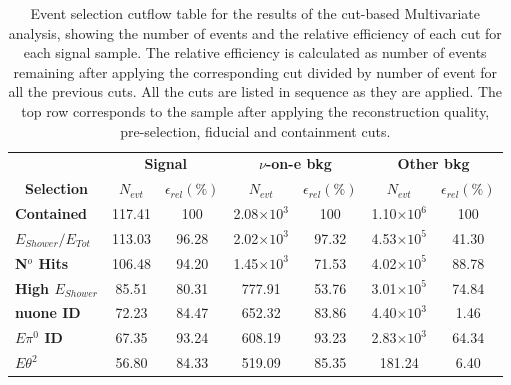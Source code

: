 \begin{table}[!hb]
\centering
\caption[Multivariate analysis cutflow table]{Event selection cutflow table for the results of the cut-based Multivariate analysis, showing the number of events and the relative efficiency of each cut for each signal sample. The relative efficiency is calculated as number of events remaining after applying the corresponding cut divided by number of event for all the previous cuts. All the cuts are listed in sequence as they are applied. The top row corresponds to the sample after applying the reconstruction quality, pre-selection, fiducial and containment cuts.}
\begin{tabular}{|l|cc|cc|cc|}\hline
\multicolumn{1}{|c|}{} & \multicolumn{2}{c|}{\textbf{Signal}} & \multicolumn{2}{c|}{\textbf{$\nu$-on-e bkg}} & \multicolumn{2}{c|}{\textbf{Other bkg}} \\
\multicolumn{1}{|c|}{\multirow{-2}{*}{\textbf{Selection}}} & \textbf{$N_{evt}$} & \textbf{$\epsilon_{rel}\left(\%\right)$} & \textbf{$N_{evt}$} & \textbf{$\epsilon_{rel}\left(\%\right)$}  & \textbf{$N_{evt}$} & \textbf{$\epsilon_{rel}\left(\%\right)$}\\\hline
\textbf{Contained} & 117.41 & 100 & 2.08$\times 10^3$ & 100 & 1.10$\times 10^6$ & 100\\
\textbf{$E_{Shower}/E_{Tot}$} & 113.03 & 96.28 & 2.02$\times 10^3$ & 97.32 & 4.53$\times 10^5$ & 41.30\\
\textbf{N$^o$ Hits} & 106.48 & 94.20 & 1.45$\times 10^3$ & 71.53 & 4.02$\times 10^5$ & 88.78\\
\textbf{High $E_{Shower}$} & 85.51 & 80.31 & 777.91 & 53.76 & 3.01$\times 10^5$ & 74.84\\
\textbf{\gls{nuone} ID} & 72.23 & 84.47 & 652.32 & 83.86 & 4.40$\times 10^3$ & 1.46\\
\textbf{$E\pi^0$ ID} & 67.35 & 93.24 & 608.19 & 93.23 & 2.83$\times 10^3$ & 64.34\\
\textbf{$E\theta^2$} & 56.80 & 84.33 & 519.09 & 85.35 & 181.24 & 6.40\\\hline
\end{tabular}
\label{tab:CutflowTableTMVA}
\end{table}

